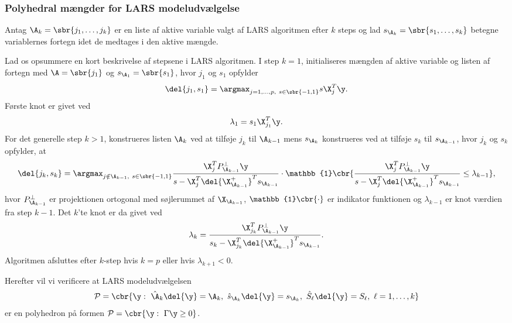 \subsubsection{Polyhedral mængder for LARS modeludvælgelse} \label{subsubsec:LARSpolyhedronkarakterisering}
Antag \(\A_k=\sbr{j_1, \ldots, j_k}\) er en liste af aktive variable valgt af LARS algoritmen efter \(k\) steps og lad \(s_{\A_k}=\sbr{s_1,\ldots,s_k}\) betegne variablernes fortegn idet de medtages i den aktive mængde.

Lad os opsummere en kort beskrivelse af stepsene i LARS algoritmen.
I step \(k=1\), initialiseres mængden af aktive variable og listen af fortegn med \(\A=\sbr{j_1}\) og \(s_{\A_1} = \sbr{s_1}\), hvor \(j_1\) og \(s_1\) opfylder
\begin{align}
\del{j_1, s_1} = \argmax_{j=1,\ldots, p, \ s \in \sbr{-1,1}} s \X_j^T \y. \label{eq:polyhedron_rep_LARS1}
\end{align}
Første knot er givet ved
\begin{align*}
\lambda_1 = s_1 \X_{j_1}^T \y.
\end{align*}
For det generelle step \(k > 1\), konstrueres listen \(\A_k\) ved at tilføje \(j_k\) til \(\A_{k-1}\) mens \(s_{\A_k}\) konstrueres ved at tilføje \(s_k\) til \(s_{\A_{k-1}}\), hvor \(j_k\) og \(s_k\) opfylder, at
\begin{align}
\del{j_k, s_k} = \argmax_{j \notin \A_{k-1} , \ s \in \sbr{-1,1}} \frac{\X_j^T P_{\A_{k-1}}^\perp \y}{s - \X_j^T \del{\X_{\A_{k-1}}^+}^T s_{\A_{k-1}}} \cdot \mathbb{1} \cbr{\frac{\X_j^T P_{\A_{k-1}}^\perp \y}{s - \X_j^T \del{\X_{\A_{k-1}}^+}^T s_{\A_{k-1}}} \leq \lambda_{k-1}}, \label{eq:polyhedron_rep_LARS2}
\end{align}
hvor \(P_{\A_{k-1}}^\perp \) er projektionen ortogonal med søjlerummet af \(\X_{\A_{k-1}}\), \(\mathbb{1} \cbr{\cdot}\) er indikator funktionen og \(\lambda_{k-1}\) er knot værdien fra step \(k-1\).
Det \(k\)'te knot er da givet ved
\begin{align}
\lambda_k = \frac{\X_{j_k}^T P_{\A_{k-1}}^\perp \y}{s_k - \X_{j_k}^T \del{\X_{\A_{k-1}}^+}^T s_{\A_{k-1}}}. \label{eq:polyhedron_rap_LARS3}
\end{align}
Algoritmen afsluttes efter \(k\)-step hvis \(k=p\) eller hvis \(\lambda_{k+1} < 0\).

Herefter vil vi verificere at LARS modeludvælgelsen
\begin{align}
\mathcal{P} = \cbr{\y: \ \hat{\A}_k \del{\y} = \A_k, \ \hat{s}_{\A_k} \del{\y} = s_{\A_k}, \ \hat{S}_\ell \del{\y} = S_\ell, \ \ell = 1, \ldots, k} \label{eq:post_28}
\end{align}
er en polyhedron på formen \(\mathcal{P} = \cbr{\y : \ \Gamma \y \geq 0}\).

